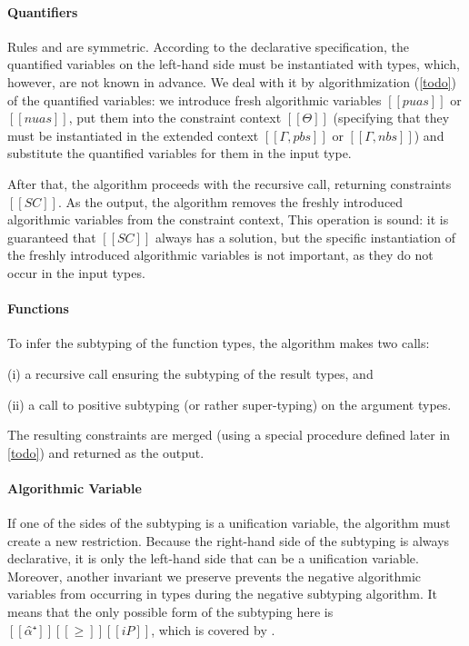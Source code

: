 \paragraph{Quantifiers}  
Rules  and 
 are symmetric. 
According to the declarative specification, 
the quantified variables on the left-hand side must be instantiated 
with types, which, however, are not known in advance.
We deal with it by algorithmization (\cref{todo})
of the quantified variables:
we introduce fresh algorithmic variables
$[[puas]]$ or $[[nuas]]$,
put them into the constraint context $[[Θ]]$
(specifying that they must be instantiated in the extended context
$[[Γ, pbs]]$ or $[[Γ, nbs]]$) and substitute the quantified variables
for them in the input type. 

After that, the algorithm proceeds with the recursive call, returning
constraints $[[SC]]$. As the output, the algorithm removes the freshly
introduced algorithmic variables from the constraint context, This operation is
sound: it is guaranteed that $[[SC]]$ always has a solution, but the specific
instantiation of the freshly introduced algorithmic variables is not important,
as they do not occur in the input types.

\paragraph{Functions}
To infer the subtyping of the function types, the algorithm
makes two calls: 
\begin{enumerate*}
  \item[(i)] a recursive call ensuring the subtyping of the result types, and
  \item[(ii)] a call to positive subtyping (or rather super-typing) on the argument types.
\end{enumerate*}
The resulting constraints are merged (using a special procedure defined later in \cref{todo})
and returned as the output.

\paragraph{Algorithmic Variable}
If one of the sides of the subtyping is a unification variable,
the algorithm must create a new restriction. 
Because the right-hand side of the subtyping is always declarative,
it is only the left-hand side that can be a unification variable.
Moreover, another invariant we preserve prevents the negative
algorithmic variables from occurring in types during the
 negative subtyping algorithm. It means
that the only possible form of the subtyping here is $[[α̂⁺]] [[≥]] [[iP]]$,
which is covered by .

